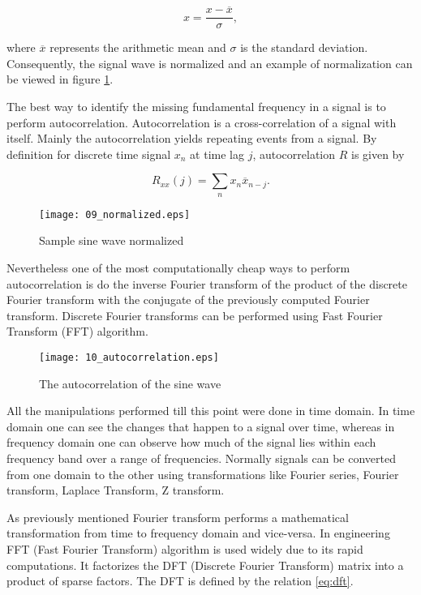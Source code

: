 \begin{equation} \label{eq:normalization}
 x = \frac{x - \overline{x}}{\sigma},
\end{equation}

\noindent
where $\overline{x}$ represents the arithmetic mean and $\sigma$ is the standard deviation. Consequently, the signal wave is normalized and an example of normalization can be viewed in figure \ref{fig:normalized}.

The best way to identify the missing fundamental frequency in a signal is to perform autocorrelation. Autocorrelation is a cross-correlation of a signal with itself. Mainly the autocorrelation yields repeating events from a signal. By definition for discrete time signal $x_n$ at time lag $j$, autocorrelation $R$ is given by

\begin{equation}\label{eq:accor}
 R_{xx}(j) = \sum_{n}x_n\overline{x}_{n-j}.
\end{equation}

\begin{figure}[!ht]
\centering
  \texttt{[image: 09\_normalized.eps]}
\caption{Sample sine wave normalized}
\label{fig:normalized}
\end{figure}

Nevertheless one of the most computationally cheap ways to perform autocorrelation is do the inverse Fourier transform of the product of the discrete Fourier transform with the conjugate of the previously computed Fourier transform. Discrete Fourier transforms can be performed using Fast Fourier Transform (FFT) algorithm.

\begin{figure}[!ht]
\centering
  \texttt{[image: 10\_autocorrelation.eps]}
\caption{The autocorrelation of the sine wave}
\label{fig:autocorrelation}
\end{figure}

All the manipulations performed till this point were done in time domain. In time domain one can see the changes that happen to a signal over time, whereas in frequency domain one can observe how much of the signal lies within each frequency band over a range of frequencies. Normally signals can be converted from one domain to the other using transformations like Fourier series, Fourier transform, Laplace Transform, Z transform. 

As previously mentioned Fourier transform performs a mathematical transformation from time to frequency domain and vice-versa. In engineering FFT (Fast Fourier Transform) algorithm is used widely due to its rapid computations. It factorizes the DFT (Discrete Fourier Transform) matrix into a product of sparse factors.  The DFT is defined by the relation \eqref{eq:dft}.

